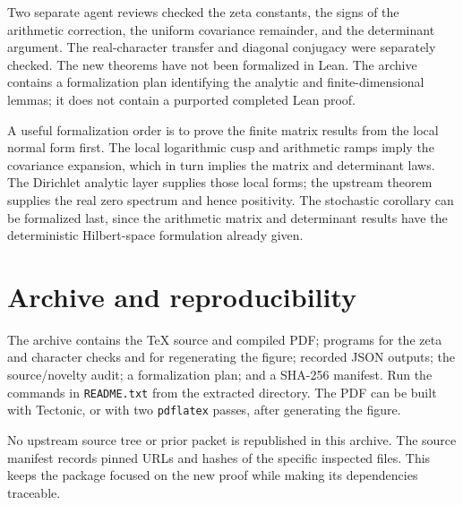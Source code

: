 \documentclass[11pt]{article}
\theoremstyle{definition}
\begin{document}
Two separate agent reviews checked the zeta constants, the signs of the
arithmetic correction, the uniform covariance remainder, and the determinant
argument. The real-character transfer and diagonal conjugacy were separately
checked. The new theorems have not been formalized in Lean. The archive contains
a formalization plan identifying the analytic and finite-dimensional lemmas;
it does not contain a purported completed Lean proof.

A useful formalization order is to prove the finite matrix results from the
local normal form first. The local logarithmic cusp and arithmetic ramps imply
the covariance expansion, which in turn implies the matrix and determinant laws.
The Dirichlet analytic layer supplies those local forms; the upstream theorem
supplies the real zero spectrum and hence positivity. The stochastic corollary
can be formalized last, since the arithmetic matrix and determinant results have
the deterministic Hilbert-space formulation already given.

\appendix
\section{Archive and reproducibility}

The archive contains the TeX source and compiled PDF; programs for the zeta and
character checks and for regenerating the figure; recorded JSON outputs;
the source/novelty audit; a formalization plan; and a SHA-256 manifest.
Run the commands in \texttt{README.txt} from the extracted directory.
The PDF can be built with Tectonic, or with two \texttt{pdflatex} passes,
after generating the figure.

No upstream source tree or prior packet is republished in this archive. The source
manifest records pinned URLs and hashes of the specific inspected files. This keeps
the package focused on the new proof while making its dependencies traceable.
\end{document}
